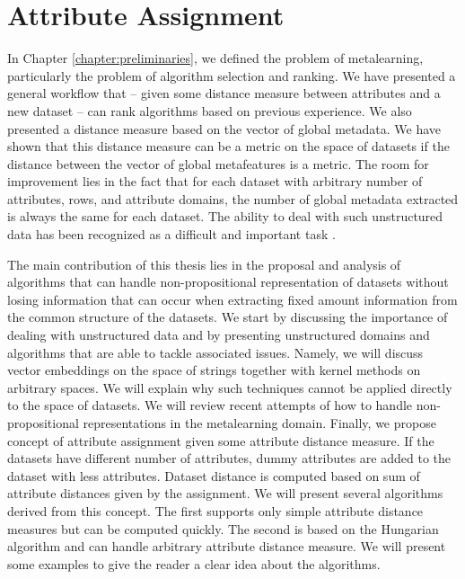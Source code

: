 
\chapter{Attribute Assignment}
\label{chapter:attributeAssignment}
In Chapter \ref{chapter:preliminaries}, we defined the problem of metalearning, particularly the problem of algorithm selection and ranking. We have presented a general workflow that -- given some distance measure between attributes and a new dataset -- can rank algorithms based on previous experience. We also presented a distance measure based on the vector of global metadata. We have shown that this distance measure can be a metric on the space of datasets if the distance between the vector of global metafeatures is a metric. The room for improvement lies in the fact that for each dataset with arbitrary number of attributes, rows, and attribute domains, the number of global metadata extracted is always the same for each dataset. The ability to deal with such unstructured data has been recognized as a difficult and important task \cite{BrazdilMetalearning-2009,RepresentationalIssuesInMetalearning}. 

The main contribution of this thesis lies in the proposal and analysis of algorithms that can handle non-propositional representation of datasets without losing information that can occur when extracting fixed amount information from the common structure of the datasets. We start by discussing the importance of dealing with unstructured data and by presenting unstructured domains and algorithms that are able to tackle associated issues. Namely, we will discuss vector embeddings on the space of strings together with kernel methods on arbitrary spaces. We will explain why such techniques cannot be applied directly to the space of datasets. We will review recent attempts of how to handle non-propositional representations in the metalearning domain. Finally, we propose concept of attribute assignment given some attribute distance measure. If the datasets have different number of attributes, dummy attributes are added to the dataset with less attributes. Dataset distance is computed based on sum of attribute distances given by the assignment. We will present several algorithms derived from this concept. The first supports only simple attribute distance measures but can be computed quickly. The second is based on the Hungarian algorithm and can handle arbitrary attribute distance measure. We will present some examples to give the reader a clear idea about the algorithms. 

